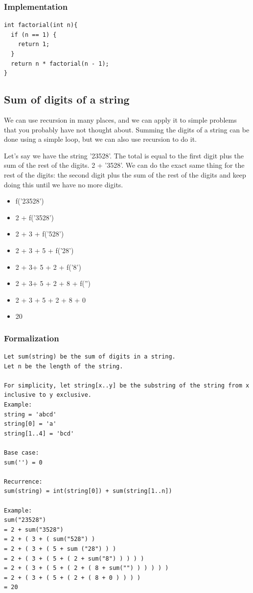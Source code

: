 \documentclass[11pt,oneside]{book}
\begin{document}
\subsubsection{Implementation}

\begin{lstlisting}
int factorial(int n){
  if (n == 1) {
    return 1;
  }
  return n * factorial(n - 1);
}
\end{lstlisting}

\subsection{Sum of digits of a string}

We can use recursion in many places, and we can apply it to simple problems that you probably have not thought about. Summing the digits of a string can be done using a simple loop, but we can also use recursion to do it.

Let's say we have the string '23528'. The total is equal to the first digit plus the sum of the rest of the digits. 2 + '3528'. We can do the exact same thing for the rest of the digits: the second digit plus the sum of the rest of the digits and keep doing this until we have no more digits.

\begin{itemize}
\item f('23528')
\item 2 + f('3528')
\item 2 + 3 + f('528')
\item 2 + 3 + 5 + f('28')
\item 2 + 3+ 5 + 2 + f('8') 
\item 2 + 3+ 5 + 2 + 8 + f('')
\item 2 + 3 + 5 + 2 + 8 + 0
\item 20
\end{itemize}

\subsubsection{Formalization}

\begin{lstlisting}
Let sum(string) be the sum of digits in a string.
Let n be the length of the string.

For simplicity, let string[x..y] be the substring of the string from x inclusive to y exclusive.
Example: 
string = 'abcd'
string[0] = 'a'
string[1..4] = 'bcd'

Base case:
sum('') = 0

Recurrence:
sum(string) = int(string[0]) + sum(string[1..n])

Example:
sum("23528")
= 2 + sum("3528")
= 2 + ( 3 + ( sum("528") )
= 2 + ( 3 + ( 5 + sum ("28") ) )
= 2 + ( 3 + ( 5 + ( 2 + sum("8") ) ) ) )
= 2 + ( 3 + ( 5 + ( 2 + ( 8 + sum("") ) ) ) ) )
= 2 + ( 3 + ( 5 + ( 2 + ( 8 + 0 ) ) ) )
= 20
\end{lstlisting}
\end{document}
